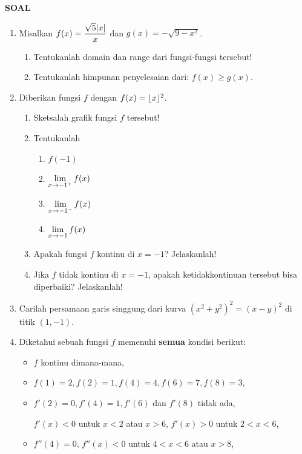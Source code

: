 \begin{center}
\textbf{\large{SOAL}}
\end{center}
\begin{enumerate}[leftmargin=*, label={\arabic*}.]
\item Misalkan $\displaystyle f(x) = \frac{\sqrt{5}\lvert x\rvert}{x}$ dan $g(x) = -\sqrt{9-x^{2}}$.
    \begin{enumerate}[label={\alph*}.]
    \item Tentukanlah domain dan range dari fungsi-fungsi tersebut!
    \item Tentukanlah himpunan penyelesaian dari: $f(x) \geq g(x)$.
    \end{enumerate}
\item Diberikan fungsi $f$ dengan $f(x) = \lfloor x\rfloor^2$.
    \begin{enumerate}[label={\alph*}.]
    \item Sketsalah grafik fungsi $f$ tersebut!
    \item Tentukanlah
        \begin{enumerate}[label={\roman*}.]
        \item $f(-1)$
        \item $\displaystyle\lim_{x\to -1^{+}} f(x)$
        \item $\displaystyle\lim_{x\to -1^{-}} f(x)$
        \item $\displaystyle\lim_{x\to -1} f(x)$
        \end{enumerate}
    \item Apakah fungsi $f$ kontinu di $x=-1$? Jelaskanlah!
    \item Jika $f$ tidak kontinu di $x=-1$, apakah ketidakkontinuan tersebut bisa 
    diperbaiki? Jelaskanlah!
    \end{enumerate}
\item Carilah persamaan garis singgung dari kurva $(x^2+y^2)^2=(x-y)^2$ di titik $(1,-1)$.
\item Diketahui sebuah fungsi $f$ memenuhi \textbf{semua} kondisi berikut:
    \begin{itemize}
    \item $f$ kontinu dimana-mana,
    \item $f(1)=2,f(2)=1,f(4)=4,f(6)=7,f(8)=3$,
    \item $f'(2)=0,f'(4)=1,f'(6)$ dan $f'(8)$ tidak ada,
    
    $f'(x)<0$ untuk $x < 2$ atau $x>6$, $f'(x)>0$ untuk $2<x<6$,
    \item $f''(4) = 0$, $f''(x)<0$ untuk $4<x<6$ atau $x > 8$,
    

\end{itemize}
\end{enumerate}
